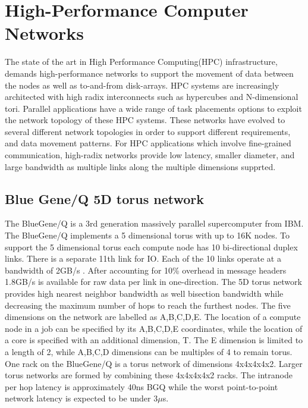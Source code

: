 \documentclass{acm_proc_article-sp}
\begin{document}
\section{High-Performance Computer Networks}

The state of the art in High Performance Computing(HPC) infrastructure, demands high-performance networks
to support the movement of data between the nodes as well as to-and-from disk-arrays. HPC systems are
increasingly architected with high radix interconnects such as hypercubes and N-dimensional tori.
Parallel applications have a wide range of task placements options to exploit the network topology of
these HPC systems. These networks have evolved to several different network topologies in order to support
different requirements, and data movement patterns. For HPC applications which involve fine-grained communication,
high-radix networks provide low latency, smaller diameter, and large bandwidth as multiple links along the multiple
dimensions supprted.

\subsection{Blue Gene/Q 5D torus network}

The BlueGene/Q is a 3rd generation massively parallel supercomputer from IBM. The BlueGene/Q implements a 5 dimensional torus with up to 16K nodes.
To support the 5 dimensional torus each compute node has 10 bi-directional duplex links. There is a separate 11th link for IO. Each of the 10 links
operate at a bandwidth of 2GB/s \cite{BGQ_RedBook_2013}. After accounting for 10\% overhead in message headers 1.8GB/s is available for raw data per link in one-direction.
The 5D torus network provides high nearest neighbor bandwidth as well bisection bandwidth while decreasing the maximum number of hops to reach
the furthest nodes. The five dimensions on the network are labelled as
A,B,C,D,E.  The location of a compute node in a job can be specified
by its A,B,C,D,E coordinates, while the location of a core is specified
with an additional dimension, T. The E dimension is limited to a length
of 2, while A,B,C,D dimensions can be multiples of 4 to remain torus.
One rack on the BlueGene/Q is a torus network of dimensions 4x4x4x4x2.
Larger torus networks are formed by combining these 4x4x4x4x2 racks.
The intranode per hop latency is approximately 40ns BGQ \cite{BGQ_Interconnect_2012}
while the worst point-to-point network latency is expected to be under 3$\mu$s. 
\end{document}
